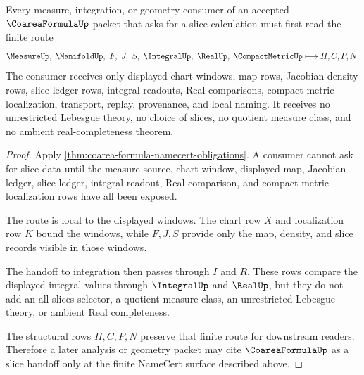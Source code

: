 \begin{theorem}
\label{thm:coarea-formula-slice-handoff}
Every measure, integration, or geometry consumer of an accepted $\CoareaFormulaUp$ packet that asks for a slice calculation must first read the finite route
$$
\MeasureUp,\ \ManifoldUp,\ F,\ J,\ S,\ \IntegralUp,\ \RealUp,\ \CompactMetricUp \longmapsto H,C,P,N .
$$
The consumer receives only displayed chart windows, map rows, Jacobian-density rows, slice-ledger rows, integral readouts, Real comparisons, compact-metric localization, transport, replay, provenance, and local naming. It receives no unrestricted Lebesgue theory, no choice of slices, no quotient measure class, and no ambient real-completeness theorem.
\end{theorem}
\begin{proof}
Apply \autoref{thm:coarea-formula-namecert-obligations}. A consumer cannot ask for slice data until the measure source, chart window, displayed map, Jacobian ledger, slice ledger, integral readout, Real comparison, and compact-metric localization rows have all been exposed.

The route is local to the displayed windows. The chart row $X$ and localization row $K$ bound the windows, while $F,J,S$ provide only the map, density, and slice records visible in those windows.

The handoff to integration then passes through $I$ and $R$. These rows compare the displayed integral values through $\IntegralUp$ and $\RealUp$, but they do not add an all-slices selector, a quotient measure class, an unrestricted Lebesgue theory, or ambient Real completeness.

The structural rows $H,C,P,N$ preserve that finite route for downstream readers. Therefore a later analysis or geometry packet may cite $\CoareaFormulaUp$ as a slice handoff only at the finite NameCert surface described above.
\end{proof}



